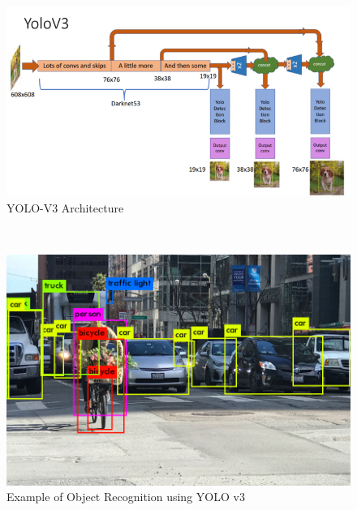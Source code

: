 \documentclass[11pt, a4paper, openany]{book}
\begin{document}
\begin{figure}[H]
    \centering
    \includegraphics[scale=1.0]{Labbot&ele/w1.png}
    \caption{YOLO-V3 Architecture\cite{redmon2018yolov3}}
    \label{fig:Package} %
\end{figure}\
\begin{figure}[H]
    \centering
    \includegraphics[scale=0.5]{Labbot&ele/o15.png}
    \caption{Example of Object Recognition using YOLO v3~\cite{Yolov3}}
    \label{fig:Package}
\end{figure}\
\end{document}
